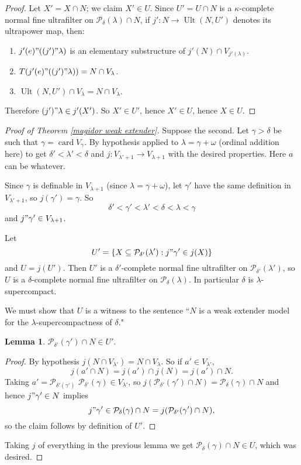 \documentclass[12pt]{report}
\newcommand{\card}{\operatorname{card}}
\newcommand{\pset}{\mathcal{P}}
\DeclareMathOperator{\Ult}{Ult}
\theoremstyle{definition}
\newtheorem{lemma}[theorem]{Lemma}
\begin{document}
\begin{proof}
Let $X' = X \cap N$; we claim $X' \in U$. Since $U' = U \cap N$ is a $\kappa$-complete normal fine ultrafilter on $\pset_\delta(\lambda) \cap N$, if $j': N \to \Ult(N, U')$ denotes its ultrapower map, then:
\begin{enumerate}
\item $j'(e)"((j')"\lambda)$ is an elementary substructure of $j'(N) \cap V_{j'(\lambda)}$.
\item $T(j'(e)"((j')"\lambda)) = N \cap V_\lambda$.
\item $\Ult(N, U') \cap V_\lambda = N \cap V_\lambda$.
\end{enumerate}
Therefore $(j')"\lambda \in j'(X')$.
So $X' \in U'$, hence $X' \in U$, hence $X \in U$.
\end{proof}

\begin{proof}[Proof of Theorem \ref{magidor weak extender}]
Suppose the second. Let $\gamma > \delta$ be such that $\gamma = \card V_\gamma$.
By hypothesis applied to $\lambda = \gamma + \omega$ (ordinal addition here) to get $\delta' < \lambda' < \delta$ and $j: V_{\lambda' + 1} \to V_{\lambda + 1}$ with the desired properties. Here $a$ can be whatever.

Since $\gamma$ is definable in $V_{\lambda + 1}$ (since $\lambda = \gamma + \omega$), let $\gamma'$ have the same definition in $V_{\lambda' + 1}$, so $j(\gamma') = \gamma$. So
$$\delta' < \gamma' < \lambda' < \delta < \lambda < \gamma$$
and $j"\gamma' \in V_{\lambda + 1}$.

Let
$$U' = \{X \subseteq \pset_{\delta'}(\lambda'): j"\gamma' \in j(X)\}$$
and $U = j(U')$. Then $U'$ is a $\delta'$-complete normal fine ultrafilter on $\pset_{\delta'}(\lambda')$, so $U$ is a $\delta$-complete normal fine ultrafilter on $\pset_\delta(\lambda)$. In particular $\delta$ is $\lambda$-supercompact.

We must show that $U$ is a witness to the sentence ``$N$ is a weak extender model for the $\lambda$-supercompactness of $\delta$."
\begin{lemma}
$\pset_{\delta'}(\gamma') \cap N \in U'$.
\end{lemma}
\begin{proof}
By hypothesis $j(N \cap V_{\lambda'}) = N \cap V_\lambda$. So if $a' \in V_{\lambda'}$,
$$j(a' \cap N) = j(a') \cap j(N) = j(a') \cap N.$$
Taking $a' = \pset_{\delta'(\gamma')}$ $\pset_{\delta'}(\gamma) \in V_{\lambda'}$, so $j(\pset_{\delta'}(\gamma') \cap N) = \pset_\delta(\gamma) \cap N$ and hence $j"\gamma' \in N$ implies
$$j"\gamma' \in \pset_\delta(\gamma) \cap N = j(\pset_{\delta'}(\gamma') \cap N),$$
so the claim follows by definition of $U'$.
\end{proof}
Taking $j$ of everything in the previous lemma we get $\pset_\delta(\gamma) \cap N \in U$, which was desired.


\end{proof}
\end{document}
